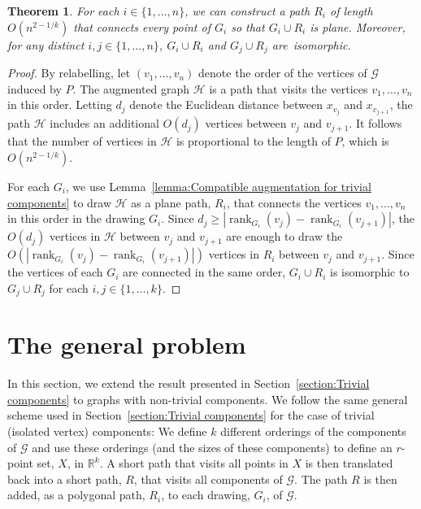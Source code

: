 \documentclass{patmorin}
\newtheorem{theorem}{Theorem}[section]
\DeclareMathOperator{\rank}{rank}
\newcommand{\R}{\mathbb{R}}
\begin{document}
\begin{theorem}\label{theorem:points}
For each $i\in \{1,\dots,n\}$, we can construct a path $R_i$ of length $O(n^{2-1/k})$ that connects every point of $G_i$ so that $G_i\cup R_i$ is plane. Moreover, for any distinct $i,j\in \{1,\dots,n\}$, $G_i\cup R_i$ and $G_j\cup R_j$ are~isomorphic.
\end{theorem}
\vspace{-.2in}
\begin{proof}
By relabelling, let $(v_1, \ldots, v_n)$ denote the order of the vertices of $\mathcal{G}$ induced by $P$.  The augmented graph $\mathcal{H}$ is a path that visits the vertices $v_1,\ldots,v_n$ in this order. Letting $d_j$ denote the Euclidean distance between $x_{v_j}$ and $x_{v_{j+1}}$, the path $\mathcal{H}$ includes an additional $O(d_j)$ vertices between $v_{j}$ and $v_{j+1}$.  It follows that the number of vertices
in $\mathcal{H}$ is proportional to the length of $P$, which is $O(n^{2-1/k})$.

For each $G_i$, we use Lemma~\ref{lemma:Compatible augmentation for trivial components} to draw $\mathcal{H}$ as a plane path, $R_i$,
that connects the vertices $v_1,\ldots,v_n$ in this order in the drawing $G_i$.
Since $d_j\ge |\rank_{G_i}(v_j) - \rank_{G_i}(v_{j+1})|$, the $O(d_j)$
vertices in $\mathcal{H}$ between $v_j$ and $v_{j+1}$ are enough to
draw the $O(|\rank_{G_i}(v_j) - \rank_{G_i}(v_{j+1})|)$ vertices in $R_i$
between $v_j$ and $v_{j+1}$.
Since the vertices of each $G_i$ are connected in the same order,
$G_i\cup R_i$ is isomorphic to $G_j\cup R_j$ for each $i,j\in\{1,\ldots,k\}$.
\end{proof}


\section{The general problem}\label{section:General}
In this section, we extend the result presented in
Section~\ref{section:Trivial components} to graphs with
non-trivial components.  We follow the same general scheme used in
Section~\ref{section:Trivial components} for the case of trivial
(isolated vertex) components:  We define $k$ different
orderings of the components of $\mathcal G$ and use these orderings (and
the sizes of these components) to define an $r$-point set, $X$, in $\R^k$. A
short path that visits all points in $X$ is then translated back into
a short path, $R$, that visits all components of $\mathcal G$. The path
$R$ is then
added, as a polygonal path, $R_i$, to each drawing, $G_i$, of $\mathcal G$.
\end{document}
